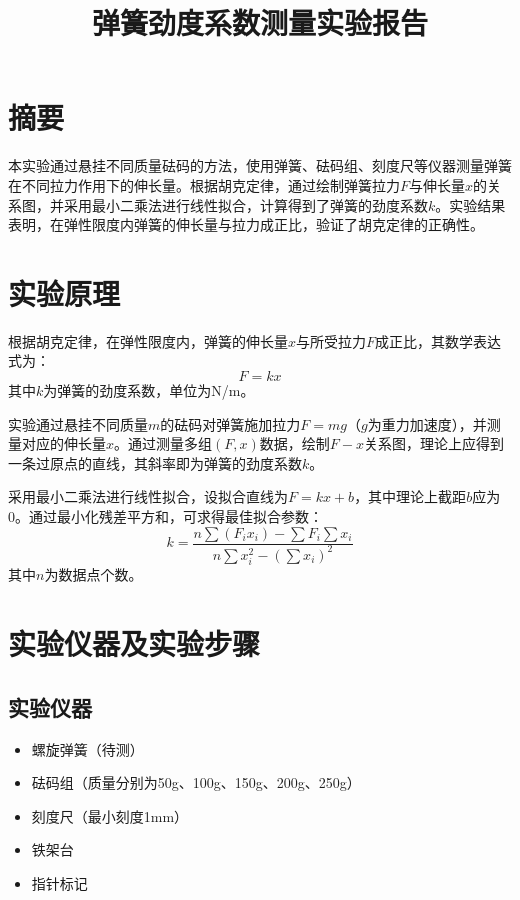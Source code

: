\documentclass[a4paper,12pt]{article}
\title{弹簧劲度系数测量实验报告}
\author{}
\date{}
\begin{document}
\maketitle

\section{摘要}
本实验通过悬挂不同质量砝码的方法，使用弹簧、砝码组、刻度尺等仪器测量弹簧在不同拉力作用下的伸长量。根据胡克定律，通过绘制弹簧拉力$F$与伸长量$x$的关系图，并采用最小二乘法进行线性拟合，计算得到了弹簧的劲度系数$k$。实验结果表明，在弹性限度内弹簧的伸长量与拉力成正比，验证了胡克定律的正确性。

\section{实验原理}
根据胡克定律，在弹性限度内，弹簧的伸长量$x$与所受拉力$F$成正比，其数学表达式为：
\begin{equation}
    F = kx
\end{equation}
其中$k$为弹簧的劲度系数，单位为N/m。

实验通过悬挂不同质量$m$的砝码对弹簧施加拉力$F=mg$（$g$为重力加速度），并测量对应的伸长量$x$。通过测量多组$(F,x)$数据，绘制$F-x$关系图，理论上应得到一条过原点的直线，其斜率即为弹簧的劲度系数$k$。

采用最小二乘法进行线性拟合，设拟合直线为$F = kx + b$，其中理论上截距$b$应为0。通过最小化残差平方和，可求得最佳拟合参数：
\begin{equation}
    k = \frac{n\sum (F_ix_i) - \sum F_i \sum x_i}{n\sum x_i^2 - (\sum x_i)^2}
\end{equation}
其中$n$为数据点个数。

\section{实验仪器及实验步骤}
\subsection{实验仪器}
\begin{itemize}
    \item 螺旋弹簧（待测）
    \item 砝码组（质量分别为50g、100g、150g、200g、250g）
    \item 刻度尺（最小刻度1mm）
    \item 铁架台
    \item 指针标记
\end{itemize}
\end{document}

